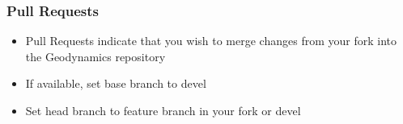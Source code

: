 \begin{frame}
 \frametitle{Pull Requests}

 \begin{itemize}
  \item \alert{Pull Requests} indicate that you wish to merge changes from your
        fork into the Geodynamics repository
  \item If available, set base branch to \alert{devel}
  \item Set head branch to feature branch in your fork or devel
 \end{itemize}
\end{frame}
